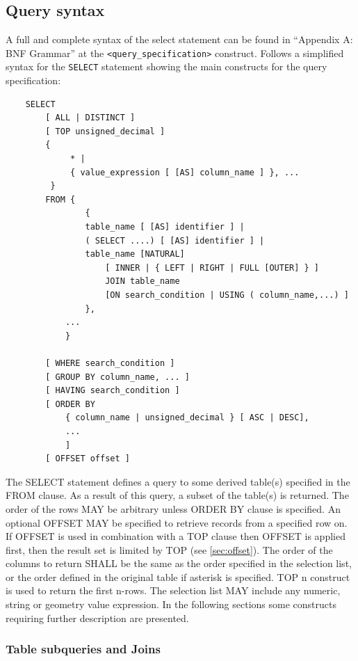 \documentclass[11pt,a4paper]{ivoa}
\begin{document}
\clearpage
\subsection{Query syntax}
\label{sec:syntax}

A full and complete syntax of the select statement can be found in “Appendix
A: BNF Grammar” at the \verb:<query_specification>: construct. Follows a simplified
syntax for the \verb:SELECT: statement showing the main constructs for the query
specification:

\begin{verbatim}
    SELECT
        [ ALL | DISTINCT ]
        [ TOP unsigned_decimal ]
        {
             * |
             { value_expression [ [AS] column_name ] }, ...
         }
        FROM {
                {
                table_name [ [AS] identifier ] |
                ( SELECT ....) [ [AS] identifier ] |
                table_name [NATURAL]
                    [ INNER | { LEFT | RIGHT | FULL [OUTER] } ]
                    JOIN table_name
                    [ON search_condition | USING ( column_name,...) ]
                },
            ...
            }

        [ WHERE search_condition ]
        [ GROUP BY column_name, ... ]
        [ HAVING search_condition ]
        [ ORDER BY
            { column_name | unsigned_decimal } [ ASC | DESC],
            ...
            ]
        [ OFFSET offset ]            
\end{verbatim}

The SELECT statement defines a query to some derived table(s) specified
in the FROM clause. As a result of this query, a subset of the table(s)
is returned. The order of the rows MAY be arbitrary unless ORDER BY clause
is specified. An optional OFFSET MAY be specified to retrieve records from 
a specified row on. If OFFSET is used in combination with a TOP clause
then OFFSET is applied first, then the result set is limited by TOP 
(see \ref{sec:offset}). 
The order of the columns to return SHALL be the same as the
order specified in the selection list, or the order defined in the original
table if asterisk is specified. TOP n construct is used to return the first
n-rows. The selection list MAY include any numeric, string or geometry value
expression. In the following sections some constructs requiring further
description are presented.

\subsubsection{Table subqueries and Joins}
\label{sec:subqueries}
\end{document}
